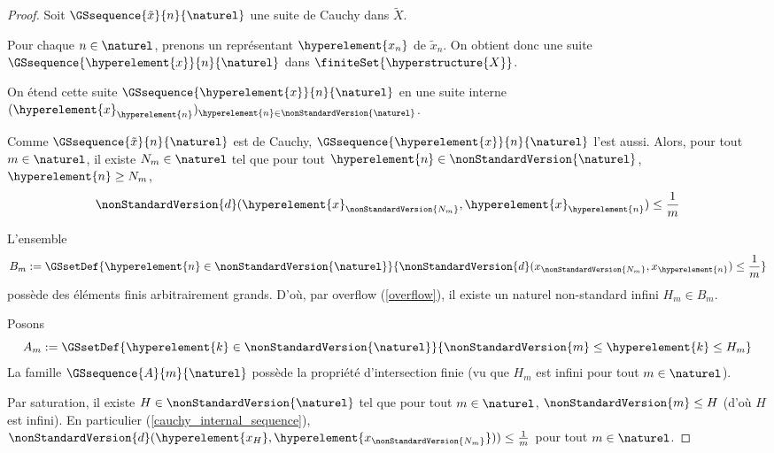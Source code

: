 \ifdefined\outputproof
\begin{proof}
	Soit $\GSsequence{\tilde{x}}{n}{\naturel}$ une suite de Cauchy dans
	$\tilde{X}$.

	Pour chaque $n \in \naturel$, prenons un représentant
	$\hyperelement{x_{n}}$ de $\tilde{x}_{n}$. On obtient donc une suite
	$\GSsequence{\hyperelement{x}}{n}{\naturel}$ dans
	$\finiteSet{\hyperstructure{X}}$.

	On étend cette suite $\GSsequence{\hyperelement{x}}{n}{\naturel}$ en une
	suite interne
	$(\hyperelement{x}_{\hyperelement{n}})_{\hyperelement{n} \in
	\nonStandardVersion{\naturel}}$.

	Comme $\GSsequence{\tilde{x}}{n}{\naturel}$ est de Cauchy,
	$\GSsequence{\hyperelement{x}}{n}{\naturel}$ l'est aussi.
	Alors, pour tout $m \in \naturel$, il existe $N_{m} \in \naturel$ tel que
	pour tout $\hyperelement{n} \in \nonStandardVersion{\naturel}$,
	$\hyperelement{n} \geq N_{m}$,
	\begin{equation}
		\nonStandardVersion{d}(\hyperelement{x}_{\nonStandardVersion{N_{m}}},
		\hyperelement{x}_{\hyperelement{n}}) \leq \frac{1}{m}
		\label{cauchy_internal_sequence}
	\end{equation}

	L'ensemble
	\begin{equation}
		B_{m} := \GSsetDef{\hyperelement{n} \in
		\nonStandardVersion{\naturel}}{\nonStandardVersion{d}(x_{\nonStandardVersion{N_{m}}},
		x_{\hyperelement{n}}) \leq \frac{1}{m}}
	\end{equation}
	possède des éléments finis arbitrairement grands. D'où, par overflow
	(\ref{overflow}), il existe un naturel non-standard infini $H_{m} \in
	B_{m}$.

	Posons
	\begin{equation}
		A_{m} := \GSsetDef{\hyperelement{k} \in
			\nonStandardVersion{\naturel}}{\nonStandardVersion{m} \leq
			\hyperelement{k} \leq H_{m}}
	\end{equation}
	La famille $\GSsequence{A}{m}{\naturel}$ possède la propriété
	d'intersection finie (vu que $H_{m}$ est infini pour tout $m \in \naturel$).

	Par saturation, il existe $H \in \nonStandardVersion{\naturel}$ tel que pour
	tout $m \in \naturel$, $\nonStandardVersion{m} \leq H$ (d'où $H$ est
	infini). En particulier (\ref{cauchy_internal_sequence}),
	$\nonStandardVersion{d}(\hyperelement{x_{H}},
	\hyperelement{x_{\nonStandardVersion{N_{m}}}})) \leq
	\frac{1}{m}$ pour tout $m \in \naturel$.


\end{proof}
